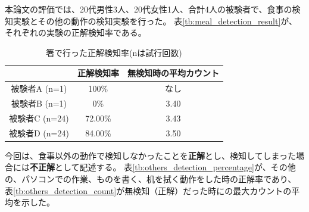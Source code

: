 本論文の評価では、20代男性3人、20代女性1人、合計4人の被験者で、食事の検知実験とその他の動作の検知実験を行った。
表\ref{tb:meal_detection_result}が、それぞれの実験の正解検知率である。


\begin{table}[htbp]
  \caption{箸で行った正解検知率(nは試行回数)}
  \label{tb:others_detection_result}
  \begin{center}
    \begin{tabular}{|c||c|c|}
      \hline
       & 正解検知率 & 無検知時の平均カウント \\
      \hline\hline
      被験者A (n=1) & 100\% & なし \\\hline
      被験者B (n=1) & 0\% & 3.40 \\\hline
      被験者C (n=24) & 72.00\% & 3.43 \\\hline
      被験者D (n=24) & 84.00\% & 3.50 \\\hline
    \end{tabular}
  \end{center}
\end{table}

今回は、食事以外の動作で検知しなかったことを\textbf{正解}とし、検知してしまった場合には\textbf{不正解}として記述する。
表\ref{tb:others_detection_percentage}が、その他の、パソコンでの作業、ものを書く、机を拭く動作をした時の正解率であり、
表\ref{tb:others_detection_count}が無検知（正解）だった時にの最大カウントの平均を示した。

